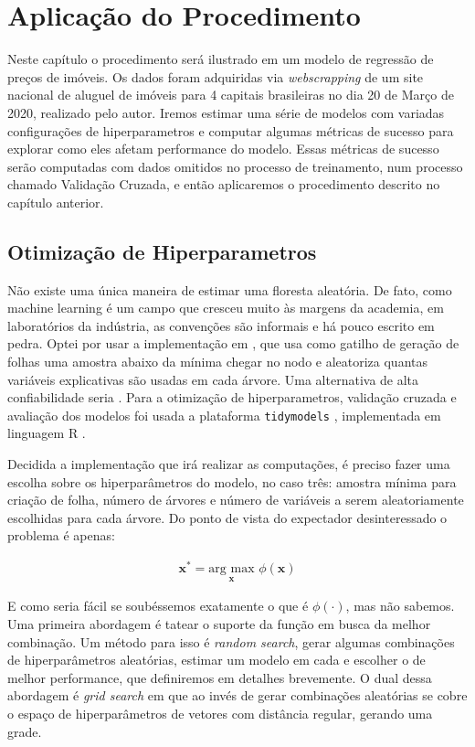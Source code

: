

\chapter{Aplicação do Procedimento}

Neste capítulo o procedimento será ilustrado em um modelo de regressão de preços de imóveis. Os dados foram adquiridas via \textit{webscrapping} de um site nacional de aluguel de imóveis para 4 capitais brasileiras no dia 20 de Março de 2020, realizado pelo autor. Iremos estimar uma série de modelos com variadas configurações de hiperparametros e computar algumas métricas de sucesso para explorar como eles afetam performance do modelo. Essas métricas de sucesso serão computadas com dados omitidos no processo de treinamento, num processo chamado Validação Cruzada, e então aplicaremos o procedimento descrito no capítulo anterior.

\section{Otimização de Hiperparametros}

Não existe uma única maneira de estimar uma floresta aleatória. De fato, como machine learning é um campo que cresceu muito às margens da academia, em laboratórios da indústria, as convenções são informais e há pouco escrito em pedra. Optei por usar a implementação em , que usa como gatilho de geração de folhas uma amostra abaixo da mínima chegar no nodo e aleatoriza quantas variáveis explicativas são usadas em cada árvore. Uma alternativa de alta confiabilidade seria . Para a otimização de hiperparametros, validação cruzada e avaliação dos modelos foi usada a plataforma \texttt{tidymodels} \cite{tidymodels}, implementada em linguagem R \cite{R}.

Decidida a implementação que irá realizar as computações, é preciso fazer uma escolha sobre os hiperparâmetros do modelo, no caso três: amostra mínima para criação de folha, número de árvores e número de variáveis a serem aleatoriamente escolhidas para cada árvore. Do ponto de vista do expectador desinteressado o problema é apenas:

\begin{align}
    \mathbf{x}^* = \underset{\mathbf{x}}{\text{arg max}} \,\,\phi(\mathbf{x}) 
\end{align}

E como seria fácil se soubéssemos exatamente o que é $\phi(\cdot)$, mas não sabemos. Uma primeira abordagem é tatear o suporte da função em busca da melhor combinação. Um método para isso é \textit{random search}, gerar algumas combinações de hiperparâmetros aleatórias, estimar um modelo em cada e escolher o de melhor performance, que definiremos em detalhes brevemente. O dual dessa abordagem é \textit{grid search} em que ao invés de gerar combinações aleatórias se cobre o espaço de hiperparâmetros de vetores com distância regular, gerando uma grade. 

